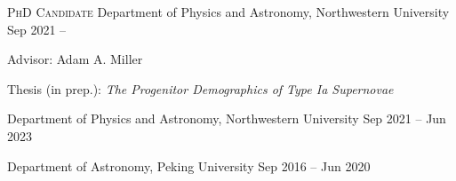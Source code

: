 


\begin{cventries}



\cvsimpentry
{{\scshape PhD Candidate}} %
{Department of Physics and Astronomy, Northwestern University} %
{Sep 2021 -- } %
{ \begin{cvitems}
	\item {Advisor: Adam A. Miller}
	\item {Thesis (in prep.): \textit{The Progenitor Demographics of Type Ia Supernovae}}
\end{cvitems}
}

\cvsimpentry
{} %
{Department of Physics and Astronomy, Northwestern University} %
{Sep 2021 -- Jun 2023} %
{}

\cvsimpentry
{} %
{Department of Astronomy, Peking University} %
{Sep 2016 -- Jun 2020} %
{ %
}

\end{cventries}